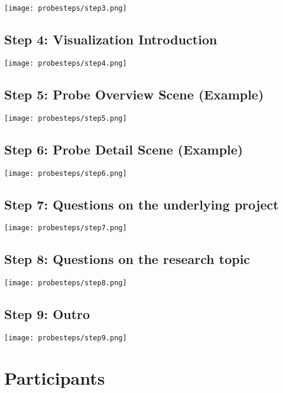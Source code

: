 \begin{appendices}
  \texttt{[image: probesteps/step3.png]}

  \subsection*{Step 4: Visualization Introduction}

  \texttt{[image: probesteps/step4.png]}

  \subsection*{Step 5: Probe Overview Scene (Example)}

  \texttt{[image: probesteps/step5.png]}

  \subsection*{Step 6: Probe Detail Scene (Example)}

  \texttt{[image: probesteps/step6.png]}

  \subsection*{Step 7: Questions on the underlying project}

  \texttt{[image: probesteps/step7.png]}

  \subsection*{Step 8: Questions on the research topic}

  \texttt{[image: probesteps/step8.png]}

  \subsection*{Step 9: Outro}

  \texttt{[image: probesteps/step9.png]}

  \newpage
  \section{Participants}
  \label{append:participants}


\end{appendices}
